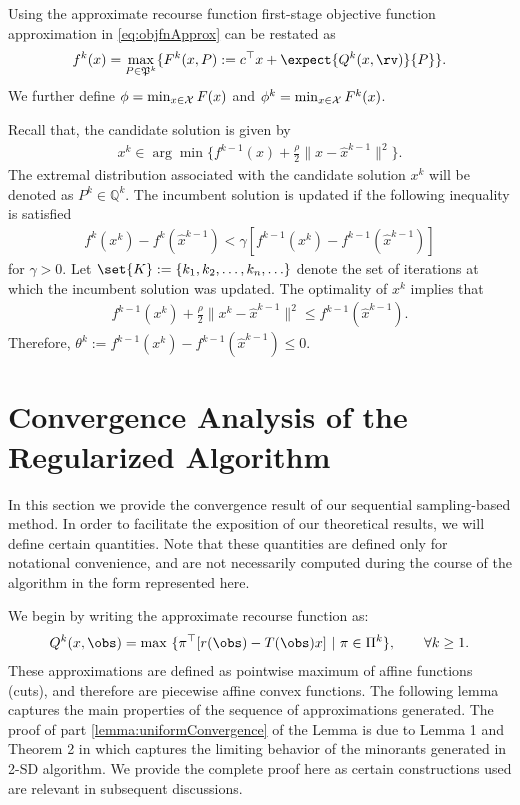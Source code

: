 \documentclass[11pt]{article}
\newcommand{\worstQ}{\mathbb{Q}}
\newcommand{\probset}{\mathfrak{P}}
\begin{document}
Using the approximate recourse function first-stage objective function approximation in \eqref{eq:objfnApprox} can be restated as
\begin{align}
    f^k(x) =  \max_{P \in \probset^k} \{F^k(x,P) := c^\top x +\expect{Q^k(x,\rv)}{P}\}.
\end{align}
We further define $\phi = \min_{x \in \cal X} F(x)$ and $\phi^k = \min_{x \in \cal X} F^k(x)$.

Recall that, the candidate solution is given by
\begin{align}
    x^k \in \arg \min \{f^{k-1}(x) + \frac{\rho}{2} \|x-\hat{x}^{k-1}\|^2\}.
\end{align}
The extremal distribution associated with the candidate solution $x^k$ will be denoted as $P^k \in \worstQ^k$. The incumbent solution is updated if the following inequality is satisfied
\begin{align} \label{eq:incumbUpdt}
    f^k(x^k) - f^k(\hat{x}^{k-1}) < \gamma [f^{k-1}(x^k) - f^{k-1}(\hat{x}^{k-1})]
\end{align}
for $\gamma > 0$. Let $\set{K} := \{k_1, k_2,\ldots, k_n, \ldots \}$ denote the set of iterations at which the incumbent solution was updated. The optimality of $x^k$ implies that
\begin{align*}
    f^{k-1}(x^k) + \frac{\rho}{2}\|x^k - \hat{x}^{k-1}\|^2 \leq f^{k-1}(\hat{x}^{k-1}).
\end{align*}
Therefore, $\theta^k := f^{k-1}(x^k) - f^{k-1}(\hat{x}^{k-1}) \leq 0$. 

\section{Convergence Analysis of the Regularized Algorithm}
In this section we provide the convergence result of our sequential sampling-based method. In order to facilitate the exposition of our theoretical results, we will define certain quantities. Note that these quantities are defined only for notational convenience, and are not necessarily computed during the course of the algorithm in the form represented here.

We begin by writing the approximate recourse function as:
\begin{align}
    Q^k(x,\obs) = \max~\{\pi^\top [r(\obs) - T(\obs)x]~|~ \pi \in \Pi^k\}, \qquad \forall k \geq 1.
\end{align}
These approximations are defined as pointwise maximum of affine functions (cuts), and therefore are piecewise affine convex functions. The following lemma captures the main properties of the sequence of approximations generated. The proof of part \ref{lemma:uniformConvergence} of the Lemma is due to Lemma 1 and Theorem 2 in \cite{Higle1991} which captures the limiting behavior of the minorants generated in 2-SD algorithm. We provide the complete proof here as certain constructions used are relevant in subsequent discussions.
\end{document}
